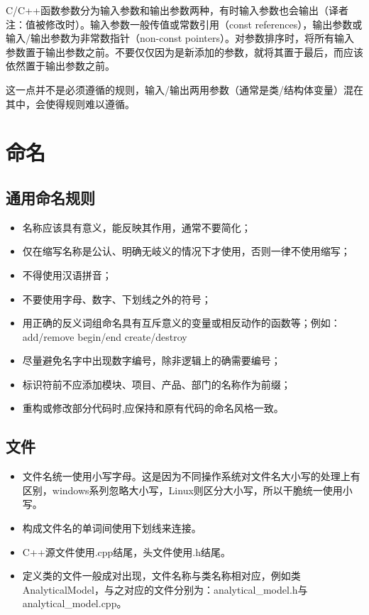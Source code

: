 C/C++函数参数分为输入参数和输出参数两种，有时输入参数也会输出（译者注：值被修改时）。输入参数一般传值或常数引用（const references），输出参数或输入/输出参数为非常数指针（non-const pointers）。对参数排序时，将所有输入参数置于输出参数之前。不要仅仅因为是新添加的参数，就将其置于最后，而应该依然置于输出参数之前。

这一点并不是必须遵循的规则，输入/输出两用参数（通常是类/结构体变量）混在其中，会使得规则难以遵循。


\chapter{命名}


\section{通用命名规则}
\begin{itemize}
  \item 名称应该具有意义，能反映其作用，通常不要简化；
  \item 仅在缩写名称是公认、明确无岐义的情况下才使用，否则一律不使用缩写；
  \item 不得使用汉语拼音；
  \item 不要使用字母、数字、下划线之外的符号；
  \item 用正确的反义词组命名具有互斥意义的变量或相反动作的函数等；例如：\\
  add/remove  begin/end  create/destroy
  \item 尽量避免名字中出现数字编号，除非逻辑上的确需要编号；
  \item 标识符前不应添加模块、项目、产品、部门的名称作为前缀；
  \item 重构或修改部分代码时,应保持和原有代码的命名风格一致。
\end{itemize}


\section{文件}
\begin{itemize}
  \item 文件名统一使用小写字母。这是因为不同操作系统对文件名大小写的处理上有区别，windows系列忽略大小写，Linux则区分大小写，所以干脆统一使用小写。
  \item 构成文件名的单词间使用下划线来连接。
  \item C++源文件使用.cpp结尾，头文件使用.h结尾。
  \item 定义类的文件一般成对出现，文件名称与类名称相对应，例如类AnalyticalModel，与之对应的文件分别为：analytical\_model.h与analytical\_model.cpp。
\end{itemize}


